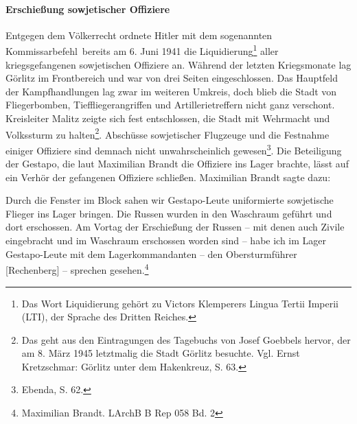 \paragraph{Erschießung sowjetischer Offiziere}
Entgegen dem Völkerrecht ordnete Hitler mit dem sogenannten \glqq Kommissarbefehl\grqq~bereits am 6. Juni 1941 die \glqq Liquidierung\grqq\footnote{Das Wort Liquidierung gehört zu Victors Klemperers Lingua Tertii Imperii (LTI), der Sprache des Dritten Reiches.} aller kriegsgefangenen sowjetischen Offiziere an. Während der letzten Kriegsmonate lag Görlitz im Frontbereich und war von drei Seiten eingeschlossen. Das Hauptfeld der Kampfhandlungen lag zwar im weiteren Umkreis, doch blieb die Stadt von Fliegerbomben, Tieffliegerangriffen und Artillerietreffern nicht ganz verschont. Kreisleiter Malitz zeigte sich fest entschlossen, die Stadt mit Wehrmacht und Volkssturm zu halten\footnote{Das geht aus den Eintragungen des Tagebuchs von Josef Goebbels hervor, der am 8. März 1945 letztmalig die Stadt Görlitz besuchte. Vgl. Ernst Kretzschmar: Görlitz unter dem Hakenkreuz, S. 63.}. Abschüsse sowjetischer Flugzeuge und die Festnahme einiger Offiziere sind demnach nicht unwahrscheinlich gewesen\footnote{Ebenda, S. 62.}. Die Beteiligung der Gestapo, die laut Maximilian Brandt die Offiziere ins Lager brachte, lässt auf ein Verhör der gefangenen Offiziere schließen. Maximilian Brandt sagte dazu:
\begin{leftbar}
Durch die Fenster im Block sahen wir Gestapo-Leute uniformierte sowjetische Flieger ins Lager bringen. Die Russen wurden in den Waschraum geführt und dort erschossen. Am Vortag der Erschießung der Russen -- mit denen auch Zivile eingebracht und im Waschraum erschossen worden sind -- habe ich im Lager Gestapo-Leute mit dem Lagerkommandanten -- den Obersturmführer [Rechenberg] -- sprechen gesehen.\footnote{Maximilian Brandt. LArchB B Rep 058 Bd. 2}
\end{leftbar}

